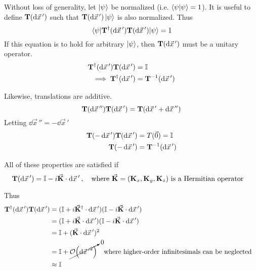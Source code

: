 \documentclass[12pt,a4paper,titlepage]{article}
\begin{document}
Without loss of generality, let $\ket{\psi}$ be normalized (i.e. $\ip{\psi}{\psi}=1$). It is useful to define $\vb{T}(\dd{\vec{x}\,'})$ such that $\vb{T}(\dd{\vec{x}\,'})\ket{\psi}$ is also normalized. Thus
\begin{equation}
\mel*{\psi}{\vb{T}^{\dagger}(\dd{\vec{x}\,'})\vb{T}(\dd{\vec{x}\,'})}{\psi}=1
\end{equation}
If this equation is to hold for arbitrary $\ket{\psi}$, then $\vb{T}(\dd{\vec{x}\,'})$ must be a unitary operator.
\begin{equation}
\begin{aligned}
\vb{T}^{\dagger}(\dd{\vec{x}\,'})\vb{T}(\dd{\vec{x}\,'})&=\mathbb{I}\\
\implies\vb{T}^{\dagger}(\dd{\vec{x}\,'})&=\vb{T}^{-1}(\dd{\vec{x}\,'})
\end{aligned}
\end{equation}

Likewise, translations are additive.
\begin{equation}
\vb{T}(\dd{\vec{x}\,''})\vb{T}(\dd{\vec{x}\,'})=\vb{T}(\dd{\vec{x}\,'}+\dd{\vec{x}\,''})
\end{equation}
Letting $\dd{\vec{x}\,''}=-\dd{\vec{x}\,'}$
\begin{equation}
\begin{aligned}
\vb{T}(-\dd{\vec{x}\,'})\vb{T}(\dd{\vec{x}\,'})&=T(\vec{0})=\mathbb{I}\\
\vb{T}(-\dd{\vec{x}\,'})&=\vb{T}^{-1}(\dd{\vec{x}\,'})
\end{aligned}
\end{equation}

All of these properties are satisfied if
\begin{equation}
\vb{T}(\dd{\vec{x}\,'})=\mathbb{I}-i\vec{\vb{K}}\cdot\dd{\vec{x}\,'},\qq{where $\vec{\vb{K}}=(\vb{K}_{x},\vb{K}_{y},\vb{K}_{z})$ is a Hermitian operator}
\end{equation}

Thus
\begin{equation}
\begin{aligned}
\vb{T}^{\dagger}(\dd{\vec{x}\,'})\vb{T}(\dd{\vec{x}\,'})&=(\mathbb{I}+i\vec{\vb{K}}^{\dagger}\cdot\dd{\vec{x}\,'})(\mathbb{I}-i\vec{\vb{K}}\cdot\dd{\vec{x}\,'})\\
&=(\mathbb{I}+i\vec{\vb{K}}\cdot\dd{\vec{x}\,'})(\mathbb{I}-i\vec{\vb{K}}\cdot\dd{\vec{x}\,'})\\
&=\mathbb{I}+(\vec{\vb{K}}\cdot\dd{\vec{x}\,'})^{2}\\
&=\mathbb{I}+\cancelto{0}{\order{\dd{\vec{x}\,'}^{2}}}\qq{where higher-order infinitesimals can be neglected}\\
&\approx\mathbb{I}
\end{aligned}
\end{equation}
\end{document}
